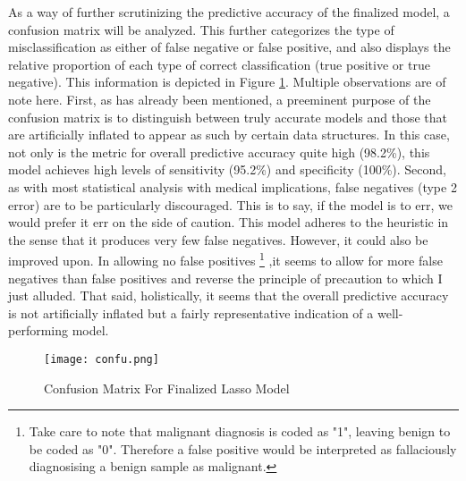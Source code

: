 \documentclass[11pt]{article}
\begin{document}
	As a way of further scrutinizing the predictive accuracy of the finalized model, a confusion matrix will be analyzed.  This further categorizes the type of misclassification as either of false negative or false positive, and also displays the relative proportion of each type of correct classification (true positive or true negative).  This information is depicted in Figure \ref{fig:conf}.    Multiple observations are of note here.  First, as has already been mentioned, a preeminent purpose of the confusion matrix is to distinguish between truly accurate models and those that are artificially inflated to appear as such by certain data structures.  In this case, not only is the metric for overall predictive accuracy quite high (98.2\%), this model achieves high levels of sensitivity (95.2\%) and specificity (100\%).  Second, as with most statistical analysis with medical implications, false negatives (type 2 error) are to be particularly discouraged.  This is to say, if the model is to err, we would prefer it err on the side of caution.  This model adheres to the heuristic in the sense that it produces very few false negatives.  However, it could also be improved upon.  In allowing no false positives \footnote{Take care to note that malignant diagnosis is coded as "1", leaving benign to be coded as "0".  Therefore a false positive would be interpreted as fallaciously diagnosising a benign sample as malignant.} ,it seems to allow for more false negatives than false positives and reverse the principle of precaution to which I just alluded.  That said, holistically, it seems that the overall predictive accuracy is not artificially inflated but a fairly representative indication of a well-performing model.  


\begin{figure}[htbp]
\centerline{\texttt{[image: confu.png]}}
\caption{Confusion Matrix For Finalized Lasso Model}\label{fig:conf}
\end{figure}
	


	
\end{document}
